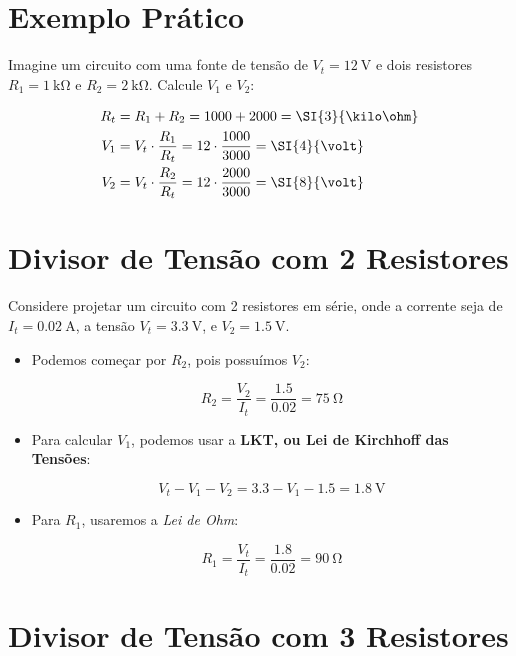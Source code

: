 \documentclass[]{article}
\begin{document}
\section{Exemplo Prático}

Imagine um circuito com uma fonte de tensão de $V_t=\SI{12}{\volt}$ e dois resistores $R_1=\SI{1}{\kilo\ohm}$ e $R_2=\SI{2}{\kilo\ohm}$. Calcule $ V_1$ e $V_2$:

\begin{equation}
	\centering
	\begin{aligned}
		R_t &= R_1 + R_2 = 1000 + 2000 = \SI{3}{\kilo\ohm} \\
		V_1 & = V_t \cdot \frac{R_1}{R_t} = 12 \cdot \frac{1000}{3000} = \SI{4}{\volt} \\
		V_2 & = V_t \cdot \frac{R_2}{R_t} = 12 \cdot \frac{2000}{3000} = \SI{8}{\volt}
	\end{aligned}
\end{equation}

\section{Divisor de Tensão com 2 Resistores}
Considere projetar um circuito com 2 resistores em série, onde a corrente seja de $I_t = \SI{0.02}{\ampere}$, a tensão $V_t = \SI{3.3}{\volt}$, e $V_2 = \SI{1.5}{\volt}$.

\begin{itemize}
	\item Podemos começar por $R_2$, pois possuímos $V_2$:
	
	$$
	R_2 = \frac{V_2}{I_t} = \frac{1.5}{0.02} = \SI{75}{\ohm}
	$$
	
	\item Para calcular $V_1$, podemos usar a \textbf{LKT, ou Lei de Kirchhoff das Tensões}:
	
	$$
	V_t - V_1 - V_2 = 3.3 - V_1 - 1.5 = \SI{1.8}{\volt}
	$$
	
	\item Para $R_1$, usaremos a \textit{Lei de Ohm}:
	
	$$
	R_1 = \frac{V_t}{I_t} = \frac{1.8}{0.02} = \SI{90}{\ohm}
	$$
\end{itemize}

\section{Divisor de Tensão com 3 Resistores}
\end{document}
